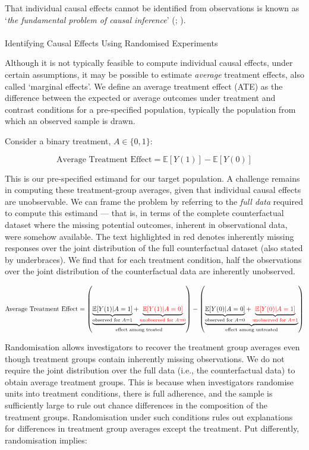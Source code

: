\documentclass[
  single column]{article}
\makeatletter
\let\oldparagraph\paragraph
\renewcommand{\paragraph}{
    \@ifstar
      \xxxParagraphStar
      \xxxParagraphNoStar
  }
\newcommand{\xxxParagraphStar}[1]{\oldparagraph*{#1}\mbox{}}
\newcommand{\xxxParagraphNoStar}[1]{\oldparagraph{#1}\mbox{}}
\makeatother
\begin{document}
That individual causal effects cannot be identified from observations is
known as `\emph{the fundamental problem of causal inference}'
(;
).

\paragraph{Identifying Causal Effects Using Randomised
Experiments}\label{identifying-causal-effects-using-randomised-experiments}

Although it is not typically feasible to compute individual causal
effects, under certain assumptions, it may be possible to estimate
\emph{average} treatment effects, also called `marginal effects'. We
define an average treatment effect (ATE) as the difference between the
expected or average outcomes under treatment and contrast conditions for
a pre-specified population, typically the population from which an
observed sample is drawn.

Consider a binary treatment, \(A \in \{0,1\}\):

\[
\text{Average Treatment Effect} = \mathbb{E}[Y(1)] - \mathbb{E}[Y(0)]
\]

This is our pre-specified estimand for our target population. A
challenge remains in computing these treatment-group averages, given
that individual causal effects are unobservable. We can frame the
problem by referring to the \emph{full data} required to compute this
estimand --- that is, in terms of the complete counterfactual dataset
where the missing potential outcomes, inherent in observational data,
were somehow available. The text highlighted in red denotes inherently
missing responses over the joint distribution of the full counterfactual
dataset (also stated by underbraces). We find that for each treatment
condition, half the observations over the joint distribution of the
counterfactual data are inherently unobserved.

\[
\text{Average Treatment Effect} = \left(\underbrace{\underbrace{\mathbb{E}[Y(1)|A = 1]}_{\text{observed for } A = 1} + \underbrace{\textcolor{red}{\mathbb{E}[Y(1)|A = 0]}}_{\textcolor{red}{\text{unobserved for } A = 0}}}_{\text{effect among treated}}\right) - \left(\underbrace{\underbrace{\mathbb{E}[Y(0)|A = 0]}_{\text{observed for } A = 0} + \underbrace{\textcolor{red}{\mathbb{E}[Y(0)|A = 1]}}_{\textcolor{red}{\text{unobserved for } A = 1}}}_{\text{effect among untreated}}\right)
\]

Randomisation allows investigators to recover the treatment group
averages even though treatment groups contain inherently missing
observations. We do not require the joint distribution over the full
data (i.e., the counterfactual data) to obtain average treatment groups.
This is because when investigators randomise units into treatment
conditions, there is full adherence, and the sample is sufficiently
large to rule out chance differences in the composition of the treatment
groups. Randomisation under such conditions rules out explanations for
differences in treatment group averages except the treatment. Put
differently, randomisation implies:
\end{document}
